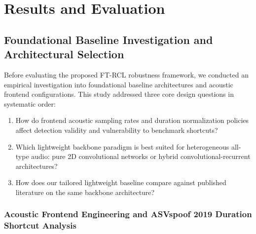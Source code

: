 \chapter{Results and Evaluation}
\label{ch:results}

\section{Foundational Baseline Investigation and Architectural Selection}
\label{sec:baseline-investigation}

Before evaluating the proposed FT-RCL robustness framework, we conducted an empirical investigation into foundational baseline architectures and acoustic frontend configurations. This study addressed three core design questions in systematic order:
\begin{enumerate}
  \item How do frontend acoustic sampling rates and duration normalization policies affect detection validity and vulnerability to benchmark shortcuts?
  \item Which lightweight backbone paradigm is best suited for heterogeneous all-type audio: pure 2D convolutional networks or hybrid convolutional-recurrent architectures?
  \item How does our tailored lightweight baseline compare against published literature on the same backbone architecture?
\end{enumerate}

\subsection{Acoustic Frontend Engineering and ASVspoof 2019 Duration Shortcut Analysis}
\label{subsec:frontend-duration-shortcuts}

